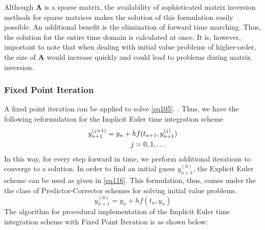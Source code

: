 Although $\mathbf{A}$ is a sparse matrix, the availability of sophisticated matrix inversion methods for sparse matrices makes the solution of this formulation easily possible. An additional benefit is the elimination of forward time marching. Thus, the solution for the entire time domain is calculated at once. It is, however, important to note that when dealing with initial value problems of higher-order, the size of $\mathbf{A}$ would increase quickly and could lead to problems during matrix inversion. 

\subsubsection{Fixed Point Iteration}\label{sec:implicitEulerIterative}
A fixed point iteration can be applied to solve \cref{eq105}. \parencite[See][pg. 105]{Fuhrer2001}. Thus, we have the following reformulation for the Implicit Euler time integration scheme 
\begin{gather}
\label{eq115}
\begin{gathered}
y^{(j+1)}_{n+1} = y_n + h f(t_{n+1}, y^{(j)}_{n+1}) \\
\text{\hspace{15mm}} j = 0,1,\ldots
\end{gathered}
\end{gather}
In this way, for every step forward in time, we perform additional iterations to converge to a solution. In order to find an initial guess $y^{(0)}_{n+1}$, the Explicit Euler scheme can be used as given in \cref{eq116}. This formulation, thus, comes under the the class of Predictor-Corrector schemes for solving initial value problems.
\begin{equation}
\label{eq116}
y^{(0)}_{n+1} = y_n + h f(t_n, y_n)
\end{equation}
The algorithm for procedural implementation of the Implicit Euler time integration scheme with Fixed Point Iteration is as shown below:
